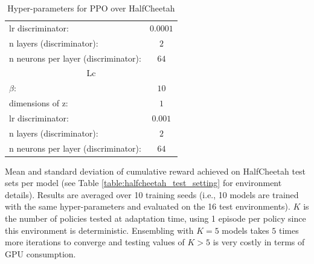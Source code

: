\begin{table}[h!]
\begin{center}
\begin{tabular}{l|c}
    lr discriminator: &  $0.0001$\\
    n layers (discriminator): & $2$ \\ 
    n neurons per layer (discriminator): &  $64$\\\toprule
    \multicolumn{2}{c}{Lc} \\ 
    \hline
    $\beta$: & $10$ \\
    dimensions of z: &  $1$\\
    lr discriminator: &  $0.001$\\
    n layers (discriminator): & $2$ \\ 
    n neurons per layer (discriminator): &  $64$\\\hline
\end{tabular}
\end{center}
\caption{Hyper-parameters for PPO over HalfCheetah}
\label{table:hp_halfcheetah}
\end{table}

\newpage

\begin{table}[h!]
\centering
 


\caption{Mean and standard deviation of cumulative reward achieved on HalfCheetah test sets per model (see Table \ref{table:halfcheetah_test_setting} for environment details). Results are averaged over 10 training seeds (i.e., 10 models are trained with the same hyper-parameters and evaluated on the 16 test environments). $K$ is the number of policies tested at adaptation time, using 1 episode per policy since this environment is deterministic. Ensembling with $K=5$ models takes $5$ times more iterations to converge and testing values of $K>5$ is very costly in terms of GPU consumption.}
\label{table:halfcheetah_test}
\end{table}

